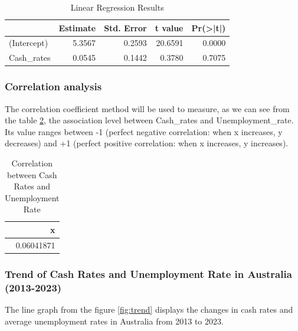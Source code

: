 \documentclass[11pt,a4paper,]{article}
\begin{document}
\begin{table}

\caption{\label{tab:linear}Linear Regression Results}
\centering
\begin{tabular}[t]{l|r|r|r|r}
\hline
  & Estimate & Std. Error & t value & Pr(>|t|)\\
\hline
(Intercept) & 5.3567 & 0.2593 & 20.6591 & 0.0000\\
\hline
Cash\_rates & 0.0545 & 0.1442 & 0.3780 & 0.7075\\
\hline
\end{tabular}
\end{table}

\begin{quote}
\end{quote}

\hypertarget{correlation-analysis}{%
\subsubsection{Correlation analysis}\label{correlation-analysis}}

The correlation coefficient method will be used to measure, as we can see from the table \ref{tab:corre}, the association level between Cash\_rates and Unemployment\_rate. Its value ranges between -1 (perfect negative correlation: when x increases, y decreases) and +1 (perfect positive correlation: when x increases, y increases).

\begin{table}

\caption{\label{tab:corre}Correlation between Cash Rates and Unemployment Rate}
\centering
\begin{tabular}[t]{r}
\hline
x\\
\hline
0.06041871\\
\hline
\end{tabular}
\end{table}

\hypertarget{trend-of-cash-rates-and-unemployment-rate-in-australia-2013-2023}{%
\subsubsection{Trend of Cash Rates and Unemployment Rate in Australia (2013-2023)}\label{trend-of-cash-rates-and-unemployment-rate-in-australia-2013-2023}}

The line graph from the figure \ref{fig:trend} displays the changes in cash rates and average unemployment rates in Australia from 2013 to 2023.
\end{document}
